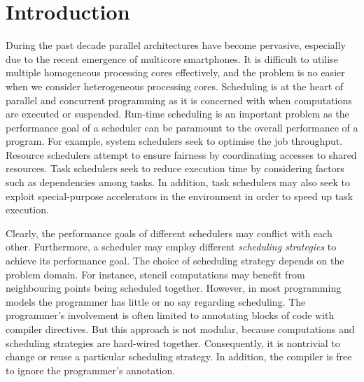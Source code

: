 \documentclass[preprint,10pt,numbers]{sigplanconf}
\begin{document}
  \section{Introduction}
During the past decade parallel architectures have become pervasive, especially due to the recent emergence of multicore smartphones. It is difficult to utilise multiple homogeneous processing cores effectively, and the problem is no easier when we consider heterogeneous processing cores. 
Scheduling is at the heart of parallel and concurrent programming as it is concerned with when computations are executed or suspended. 
Run-time scheduling is an important problem as the performance goal of a scheduler can be paramount to the overall performance of a program. For example, system schedulers seek to optimise the job throughput. Resource schedulers attempt to ensure fairness by coordinating accesses to shared resources. Task schedulers seek to reduce execution time by considering factors such as dependencies among tasks. In addition, task schedulers may also seek to exploit special-purpose accelerators in the environment in order to speed up task execution.

Clearly, the performance goals of different schedulers may conflict with each other. Furthermore, a scheduler may employ different \emph{scheduling strategies} to achieve its performance goal. The choice of scheduling strategy depends on the problem domain.
For instance, stencil computations may benefit from neighbouring points being scheduled together.
However, in most programming models the programmer has little or no say regarding scheduling. The programmer's involvement is often limited to annotating blocks of code with compiler directives. But this approach is not modular, because computations and scheduling strategies are hard-wired together. Consequently, it is nontrivial to change or reuse a particular scheduling strategy. In addition, the compiler is free to ignore the programmer's annotation.

\end{document}
